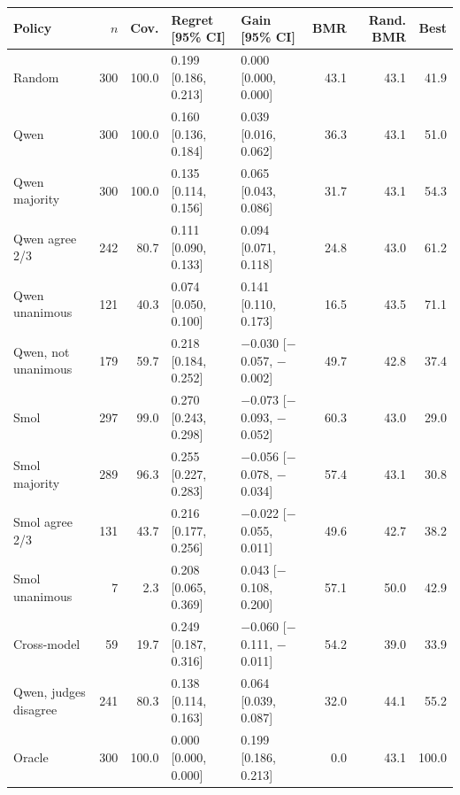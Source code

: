 

\footnotesize
\begin{tabular*}{\textwidth}{@{\extracolsep{\fill}}lrrllrrr}
\toprule
Policy & $n$ & Cov. & Regret [95\% CI] & Gain [95\% CI] & BMR & Rand. BMR & Best\\
\midrule
Random & 300 & 100.0 & 0.199 [0.186, 0.213] & 0.000 [0.000, 0.000] & 43.1 & 43.1 & 41.9\\
Qwen & 300 & 100.0 & 0.160 [0.136, 0.184] & 0.039 [0.016, 0.062] & 36.3 & 43.1 & 51.0\\
Qwen majority & 300 & 100.0 & 0.135 [0.114, 0.156] & 0.065 [0.043, 0.086] & 31.7 & 43.1 & 54.3\\
Qwen agree 2/3 & 242 & 80.7 & 0.111 [0.090, 0.133] & 0.094 [0.071, 0.118] & 24.8 & 43.0 & 61.2\\
Qwen unanimous & 121 & 40.3 & 0.074 [0.050, 0.100] & 0.141 [0.110, 0.173] & 16.5 & 43.5 & 71.1\\
Qwen, not unanimous & 179 & 59.7 & 0.218 [0.184, 0.252] & $-$0.030 [$-$0.057, $-$0.002] & 49.7 & 42.8 & 37.4\\
Smol & 297 & 99.0 & 0.270 [0.243, 0.298] & $-$0.073 [$-$0.093, $-$0.052] & 60.3 & 43.0 & 29.0\\
Smol majority & 289 & 96.3 & 0.255 [0.227, 0.283] & $-$0.056 [$-$0.078, $-$0.034] & 57.4 & 43.1 & 30.8\\
Smol agree 2/3 & 131 & 43.7 & 0.216 [0.177, 0.256] & $-$0.022 [$-$0.055, 0.011] & 49.6 & 42.7 & 38.2\\
Smol unanimous & 7 & 2.3 & 0.208 [0.065, 0.369] & 0.043 [$-$0.108, 0.200] & 57.1 & 50.0 & 42.9\\
Cross-model & 59 & 19.7 & 0.249 [0.187, 0.316] & $-$0.060 [$-$0.111, $-$0.011] & 54.2 & 39.0 & 33.9\\
Qwen, judges disagree & 241 & 80.3 & 0.138 [0.114, 0.163] & 0.064 [0.039, 0.087] & 32.0 & 44.1 & 55.2\\
Oracle & 300 & 100.0 & 0.000 [0.000, 0.000] & 0.199 [0.186, 0.213] & 0.0 & 43.1 & 100.0\\
\bottomrule
\end{tabular*}
